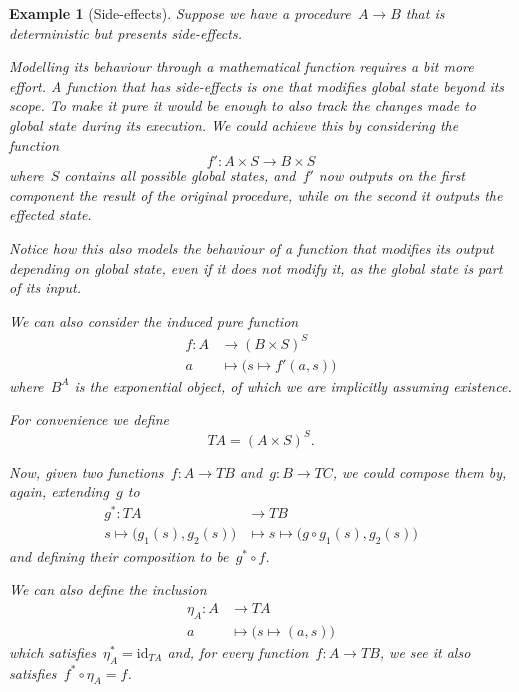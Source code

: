 \documentclass[a4paper]{article}
\theoremstyle{plain}
\newtheorem{example}[theorem]{Example}
\theoremstyle{definition}
\newcommand{\id}{\mathrm{id}}
\begin{document}
\begin{example}[Side-effects]
    \label{ex:kleisli-side-effects}
    Suppose we have a procedure~\(A\longrightarrow B\) that is deterministic but
    presents side-effects.

    Modelling its behaviour through a mathematical function requires a bit more
    effort. A function that has side-effects is one that modifies global state
    beyond its scope. To make it pure it would be enough to also track the
    changes made to global state during its execution. We could achieve this by
    considering the function
    \[
        f':A\times S\longrightarrow B\times S
    \]
    where~\(S\) contains all possible global states, and~\(f'\) now outputs on
    the first component the result of the original procedure, while on the
    second it outputs the effected state.

    Notice how this also models the behaviour of a function that modifies its
    output depending on global state, even if it does not modify it, as the
    global state is part of its input.

    We can also consider the induced pure function
    \begin{align*}
        f:A&\longrightarrow(B\times S)^{S} \\
        a&\longmapsto\bigr(s\mapsto f'(a,s)\bigl)
    \end{align*}
    where~\(B^{A}\) is the exponential object, of which we are implicitly
    assuming existence.

    For convenience we define
    \[
        TA = (A\times S)^{S}.
    \]

    Now, given two functions~\(f:A\longrightarrow TB\)
    and~\(g:B\longrightarrow TC\), we could compose them by, again,
    extending~\(g\) to
    \begin{align*}
        g^{\ast}:TA&\longrightarrow TB \\
        s\mapsto\bigl(g_{1}(s),g_{2}(s)\bigr)&\longmapsto
        s\mapsto\bigl(g\circ g_{1}(s),g_{2}(s)\bigr)
    \end{align*}
    and defining their composition to be~\(g^{\ast} \circ f\).

    We can also define the inclusion
    \begin{align*}
        \eta_{A}:A&\longrightarrow TA \\
        a&\longmapsto\bigl(s\mapsto(a,s)\bigr)
    \end{align*}
    which satisfies~\(\eta_{A}^{\ast}=\id_{TA}\) and, for every
    function~\(f:A\longrightarrow TB\), we see it also
    satisfies~\(f^{\ast}\circ\eta_{A}=f\).
\end{example}
\end{document}
